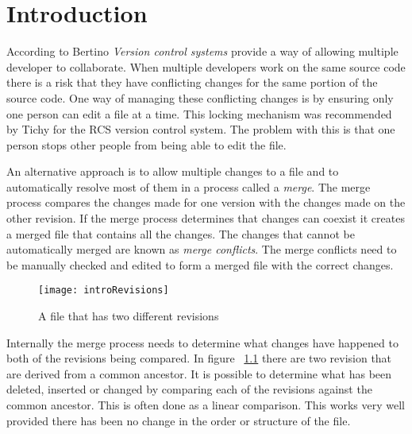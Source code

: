 
\chapter{Introduction}\label{C:intro}

According to Bertino \cite{Bertino2012} \emph{Version control systems} provide a way of allowing multiple developer to collaborate. When multiple developers work on the same source code there is a risk that they have conflicting changes for the same portion of the source code.  One way of managing these conflicting changes is by ensuring only one person can edit a file at a time. This locking mechanism was recommended by Tichy \cite{Tichy1982} for the RCS version control system. The problem with this is that one person stops other people from being able to edit the file. 

An alternative approach is to allow multiple changes to a file and to automatically resolve most of them in a process called a \emph{merge}.  The merge process compares the changes made for one version with the changes made on the other revision. If the merge process determines that changes can coexist it creates a merged file that contains all the changes. The changes that cannot be automatically merged are known as \emph{merge conflicts}.  The merge conflicts need to be manually checked and edited to form a merged file with the correct changes.

\begin{figure}[h]
 \begin{center}
 \texttt{[image: introRevisions]}
 \end{center}
 \caption{A file that has two different revisions}
 \label{fig:introRevisions}
\end{figure}


Internally the merge process needs to determine what changes have happened to both of the revisions being compared. In figure  ~\ref{fig:introRevisions} there are two revision that are derived from a common ancestor. It is possible to determine what has been deleted, inserted or changed by comparing each of the revisions against the common ancestor.  This is often done as a linear comparison. This works very well provided there has been no change in the order or structure of the file.



